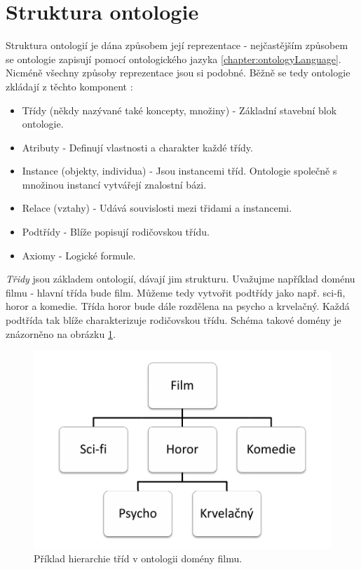 \section{Struktura ontologie}

Struktura ontologií je dána způsobem její reprezentace - nejčastějším způsobem se ontologie zapisují pomocí ontologického jazyka \ref{chapter:ontologyLanguage}.
Nicméně všechny způsoby reprezentace jsou si podobné. Běžně se tedy ontologie zkládají z těchto komponent \cite{noy}:

\begin{itemize}
\item Třídy (někdy nazývané také koncepty, množiny) - Základní stavební blok ontologie.
\item Atributy - Definují vlastnosti a charakter každé třídy.
\item Instance (objekty, individua) - Jsou instancemi tříd. Ontologie společně s množinou instancí vytvářejí znalostní bázi.
\item Relace (vztahy) - Udává souvislosti mezi třidami a instancemi.
\item Podtřídy - Blíže popisují rodičovskou třídu.
\item Axiomy - Logické formule.
\end{itemize}

\textit{Třidy} jsou základem ontologií, dávají jim strukturu. Uvažujme například doménu filmu - hlavní třída bude film. Můžeme tedy vytvořit podtřídy jako např. sci-fi, horor a komedie. Třída horor bude dále rozdělena na psycho a krvelačný. Každá podtřída tak blíže charakterizuje rodičovskou třídu. Schéma takové domény je znázorněno na obrázku \ref{img:movieClasses}.

\begin{figure}[h]
\begin{center}
\includegraphics{figures/movieClasses}
\caption{Příklad hierarchie tříd v ontologii domény filmu.}
\label{img:movieClasses}
\end{center}
\end{figure}

